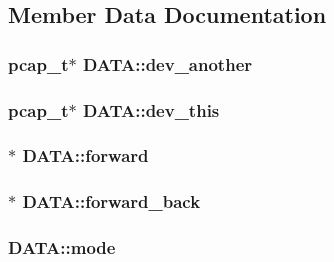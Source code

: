 \subsection{\-Member \-Data \-Documentation}
\hypertarget{structDATA_ad6cc6765ab22cb11a31b8b51d6449a41}{
\subsubsection[{dev\-\_\-another}]{\setlength{\rightskip}{0pt plus 5cm}pcap\-\_\-t$\ast$ {\bf \-D\-A\-T\-A\-::dev\-\_\-another}}}\label{structDATA_ad6cc6765ab22cb11a31b8b51d6449a41}
\hypertarget{structDATA_a2b6e3861cd032d77e6bcede1ce8eac80}{
\subsubsection[{dev\-\_\-this}]{\setlength{\rightskip}{0pt plus 5cm}pcap\-\_\-t$\ast$ {\bf \-D\-A\-T\-A\-::dev\-\_\-this}}}\label{structDATA_a2b6e3861cd032d77e6bcede1ce8eac80}
\hypertarget{structDATA_a36334fad8e030681cdad1878a05c11f3}{
\subsubsection[{forward}]{$\ast$ {\bf \-D\-A\-T\-A\-::forward}}}\label{structDATA_a36334fad8e030681cdad1878a05c11f3}
\hypertarget{structDATA_ac695dab2d15b6a320ba208820d89fe8b}{
\subsubsection[{forward\-\_\-back}]{ $\ast$ {\bf \-D\-A\-T\-A\-::forward\-\_\-back}}}\label{structDATA_ac695dab2d15b6a320ba208820d89fe8b}
\hypertarget{structDATA_ae913982f5e9e79eb6da5ca9f4b43c753}{
\subsubsection[{mode}]{ {\bf \-D\-A\-T\-A\-::mode}}}\label{structDATA_ae913982f5e9e79eb6da5ca9f4b43c753}
